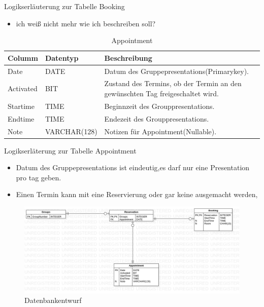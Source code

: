 \documentclass[10pt,a4paper]{article}
\begin{document}
Logikserläuterung zur Tabelle Booking
\begin{itemize}
\item ich weiß nicht mehr wie ich beschreiben soll?
\end{itemize}

\begin{table}[h]
\centering
\caption{Appointment}
    \begin{tabular}{| l | l | l | l |}
    \hline
    \rowcolor{lightgray} Columm & Datentyp & Beschreibung  \\ \hline
    Date  & DATE & Datum des Gruppepresentations(Primarykey).\\ \hline
    Activated & BIT & Zustand des Termins, ob der Termin an den gewünschten Tag freigeschaltet wird.\\ \hline
    Startime & TIME & Beginnzeit des Grouppresentations. \\ \hline
    Endtime & TIME & Endezeit des Grouppresentations.  \\ \hline
    Note & VARCHAR(128) & Notizen für Appointment(Nullable). \\ \hline
    \end{tabular}
\end{table}

Logikserläterung zur Tabelle Appointment
\begin{itemize}
\item Datum des Gruppepresentations ist eindeutig,es darf nur eine Presentation pro tag geben.
\item Einen Termin kann mit eine Reservierung oder gar keine ausgemacht werden, 
\end{itemize}

\begin{figure}[ht]
	\centering
	\includegraphics[scale=0.3]{ER-Diagramm}
	\caption{Datenbankentwurf}	
	\end{figure}
\end{document}
